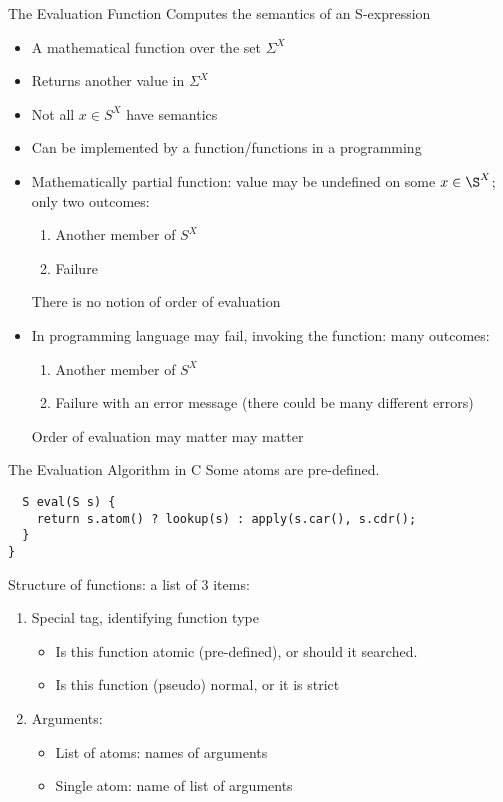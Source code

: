 \documentclass[aspectratio=169]{beamer}
\begin{document}
\begin{frame}{The Evaluation Function}
Computes the semantics of an S-expression
\begin{itemize}
    \item A mathematical function over the set $\Sigma^X$
    \item Returns another value in $\Sigma^X$
    \item Not all $x\in S^X$ have semantics
    \item Can be implemented by a function/functions in a programming 
    \item Mathematically partial function: value may be undefined 
    on some $x\in\S^X$; only two outcomes:
    \begin{enumerate}
        \item Another member of $S^X$
        \item Failure
    \end{enumerate}
        There is no notion of order of evaluation
    \item In programming language may fail, invoking the function: many outcomes:
    \begin{enumerate}
        \item Another member of $S^X$
        \item Failure with an error message (there could be many different errors)
    \end{enumerate}
        Order of evaluation may matter may matter
\end{itemize}
\end{frame}

\begin{frame}[fragile]{The Evaluation Algorithm in C}
Some atoms are pre-defined.
\begin{verbatim}
  S eval(S s) { 
    return s.atom() ? lookup(s) : apply(s.car(), s.cdr();
  }
}
\end{verbatim}
Structure of functions: a list of 3 items:
    \begin{enumerate}
        \item Special tag, identifying function type
        \begin{itemize} 
           \item Is this function atomic (pre-defined), or should it searched.
           \item Is this function (pseudo) normal, or it is strict
        \end{itemize} 
        \item Arguments:
        \begin{itemize} 
           \item List of atoms: names of arguments
           \item Single atom: name of list of arguments 
        \end{itemize} 
    \end{enumerate}
\end{frame}
\end{document}
